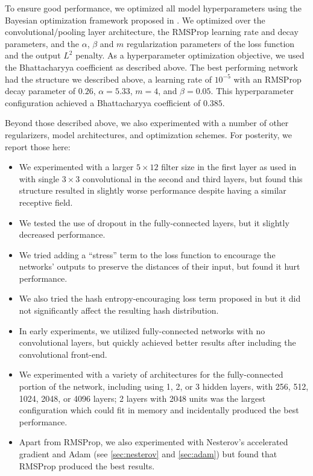 To ensure good performance, we optimized all model hyperparameters using the Bayesian optimization framework proposed in \cite{snoek2012practical}.
We optimized over the convolutional/pooling layer architecture, the RMSProp learning rate and decay parameters, and the $\alpha$, $\beta$ and $m$ regularization parameters of the loss function and the output $L^2$ penalty.
As a hyperparameter optimization objective, we used the Bhattacharyya coefficient as described above.
The best performing network had the structure we described above, a learning rate of $10^{-5}$ with an RMSProp decay parameter of $0.26$, $\alpha = 5.33$, $m = 4$, and $\beta = 0.05$.
This hyperparameter configuration achieved a Bhattacharyya coefficient of $0.385$.

Beyond those described above, we also experimented with a number of other regularizers, model architectures, and optimization schemes.
For posterity, we report those here:
\begin{itemize}
\item We experimented with a larger $5 \times 12$ filter size in the first layer as used in \cite{raffel2015large} with single $3 \times 3$ convolutional in the second and third layers, but found this structure resulted in slightly worse performance despite having a similar receptive field.
\item We tested the use of dropout \cite{hinton2012improving} in the fully-connected layers, but it slightly decreased performance.
\item We tried adding a ``stress'' \cite{kruskal1964multidimensional} term to the loss function to encourage the networks' outputs to preserve the distances of their input, but found it hurt performance.
\item We also tried the hash entropy-encouraging loss term proposed in \cite[equation (3)]{yang2015supervised} but it did not significantly affect the resulting hash distribution.
\item In early experiments, we utilized fully-connected networks with no convolutional layers, but quickly achieved better results after including the convolutional front-end.
\item We experimented with a variety of architectures for the fully-connected portion of the network, including using 1, 2, or 3 hidden layers, with 256, 512, 1024, 2048, or 4096 layers; 2 layers with 2048 units was the largest configuration which could fit in memory and incidentally produced the best performance.
\item Apart from RMSProp, we also experimented with Nesterov's accelerated gradient \cite{nesterov1983method} and Adam \cite{kingma2015adam} (see \cref{sec:nesterov} and \cref{sec:adam}) but found that RMSProp produced the best results.
\end{itemize}

